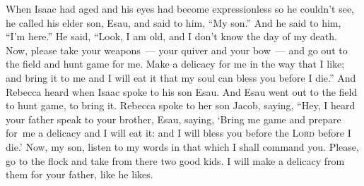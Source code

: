 
\begin{inparaenum}
   When Isaac had aged and his eyes had become expressionless so he couldn't see, he called his elder son, Esau, and said to him, ``My son.'' And he said to him, ``I'm here.''%
   He said, ``Look, I am old, and I don't know the day of my death.%
   Now, please take your weapons~--- your quiver and your bow~--- and go out to the field and hunt game for me.%
   Make a delicacy for me in the way that I like; and bring it to me and I will eat it that my soul can bless you before I die.''%
   And Rebecca heard when Isaac spoke to his son Esau. And Esau went out to the field to hunt game, to bring it.%
   Rebecca spoke to her son Jacob, saying, ``Hey, I heard your father speak to your brother, Esau, saying,%
   `Bring me game and prepare for\understood\ me a delicacy and I will eat it: and I will bless you before the \textsc{Lord} before I die.'%
   Now, my son, listen to my words in that which I shall command you.%
   Please, go to the flock and take from there two good kids. I will make a delicacy from them for your father, like he likes.%
  
  
  
  
  
\end{inparaenum}
